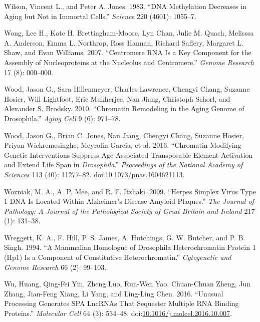 \documentclass[onehalf,12pt]{beavtex}
\begin{document}
  \hypertarget{ref-WilsonDNAmethylationdecreases1983}{}
  Wilson, Vincent L., and Peter A. Jones. 1983. ``DNA Methylation
  Decreases in Aging but Not in Immortal Cells.'' \emph{Science} 220
  (4601): 1055--7.
  
  \hypertarget{ref-WongCentromereRNAkey2007}{}
  Wong, Lee H., Kate H. Brettingham-Moore, Lyn Chan, Julie M. Quach,
  Melisssa A. Anderson, Emma L. Northrop, Ross Hannan, Richard Saffery,
  Margaret L. Shaw, and Evan Williams. 2007. ``Centromere RNA Is a Key
  Component for the Assembly of Nucleoproteins at the Nucleolus and
  Centromere.'' \emph{Genome Research} 17 (8): 000--000.
  
  \hypertarget{ref-WoodChromatinremodelingaging2010}{}
  Wood, Jason G., Sara Hillenmeyer, Charles Lawrence, Chengyi Chang,
  Suzanne Hosier, Will Lightfoot, Eric Mukherjee, Nan Jiang, Christoph
  Schorl, and Alexander S. Brodsky. 2010. ``Chromatin Remodeling in the
  Aging Genome of Drosophila.'' \emph{Aging Cell} 9 (6): 971--78.
  
  \hypertarget{ref-WoodChromatinmodifyinggeneticinterventions2016}{}
  Wood, Jason G., Brian C. Jones, Nan Jiang, Chengyi Chang, Suzanne
  Hosier, Priyan Wickremesinghe, Meyrolin Garcia, et al. 2016.
  ``Chromatin-Modifying Genetic Interventions Suppress Age-Associated
  Transposable Element Activation and Extend Life Span in
  \emph{Drosophila}.'' \emph{Proceedings of the National Academy of
  Sciences} 113 (40): 11277--82.
  doi:\href{https://doi.org/10.1073/pnas.1604621113}{10.1073/pnas.1604621113}.
  
  \hypertarget{ref-WozniakHerpessimplexvirus2009}{}
  Wozniak, M. A., A. P. Mee, and R. F. Itzhaki. 2009. ``Herpes Simplex
  Virus Type 1 DNA Is Located Within Alzheimer's Disease Amyloid
  Plaques.'' \emph{The Journal of Pathology: A Journal of the Pathological
  Society of Great Britain and Ireland} 217 (1): 131--38.
  
  \hypertarget{ref-WreggettmammalianhomologueDrosophila1994}{}
  Wreggett, K. A., F. Hill, P. S. James, A. Hutchings, G. W. Butcher, and
  P. B. Singh. 1994. ``A Mammalian Homologue of Drosophila Heterochromatin
  Protein 1 (Hp1) Is a Component of Constitutive Heterochromatin.''
  \emph{Cytogenetic and Genome Research} 66 (2): 99--103.
  
  \hypertarget{ref-WuUnusualProcessingGenerates2016}{}
  Wu, Huang, Qing-Fei Yin, Zheng Luo, Run-Wen Yao, Chuan-Chuan Zheng, Jun
  Zhang, Jian-Feng Xiang, Li Yang, and Ling-Ling Chen. 2016. ``Unusual
  Processing Generates SPA LncRNAs That Sequester Multiple RNA Binding
  Proteins.'' \emph{Molecular Cell} 64 (3): 534--48.
  doi:\href{https://doi.org/10.1016/j.molcel.2016.10.007}{10.1016/j.molcel.2016.10.007}.
  
\end{document}

